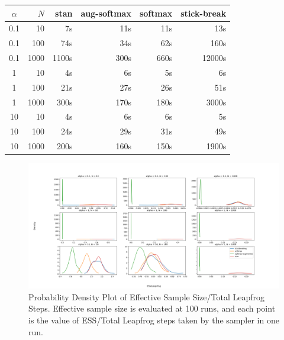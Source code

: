 \documentclass[11pt]{article}
\begin{document}
\begin{table}[!ht]
    \centering
    \begin{tabular}{c|r||r|r|r|r|}
        $\alpha$ & $N$ & stan & aug-softmax & softmax & stick-break \\ \hline 
        0.1 & 10  & 7s & 11s & 11s & 13s \\ 
        0.1 & 100 & 74s & 34s & 62s & 160s \\ 
        0.1 & 1000 & 1100s & 300s & 660s & 12000s \\ 
        1 & 10 & 4s & 6s & 5s & 6s \\ 
        1 & 100 & 21s & 27s & 26s & 51s \\ 
        1 & 1000 & 300s & 170s & 180s & 3000s \\ 
        10 & 10 & 4s & 6s & 6s & 5s \\ 
        10 & 100 & 24s & 29s & 31s & 49s \\ 
        10 & 1000 & 200s & 160s & 150s & 1900s \\
    \end{tabular}
\end{table}

\begin{figure}[t!]
    \centering
    \includegraphics[width=1.2\textwidth]{figures/simplex/ess_density.png}
    \caption{Probability Density Plot of Effective Sample Size/Total Leapfrog Steps. Effective sample size is evaluated at 100 runs, and each point is the value of ESS/Total Leapfrog steps taken by the sampler in one run.}
    \label{fig:ess_density}
\end{figure}
\end{document}
